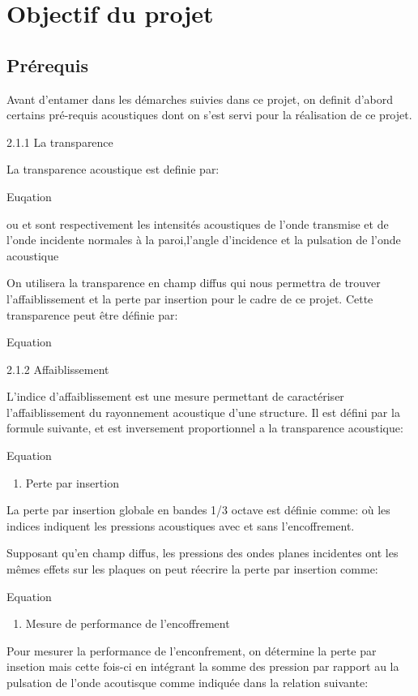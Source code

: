 \documentclass[12pt,foolscap]{report}
\begin{document}
\chapter{Objectif du projet}
\section{Prérequis }

Avant d'entamer dans les démarches suivies dans ce projet, on definit 
d'abord certains pré-requis acoustiques dont on s'est servi pour la 
réalisation de ce projet.



2.1.1 La transparence

La transparence acoustique est definie par: 

Euqation

ou et sont respectivement les intensités acoustiques de l'onde transmise et de l'onde incidente normales à la paroi,\theta l'angle d'incidence et \omega la pulsation de l'onde acoustique

On utilisera la transparence en champ diffus qui nous permettra de 
trouver l'affaiblissement et la perte par insertion pour le cadre de ce 
projet. Cette transparence peut être définie par:

Equation
 

2.1.2 Affaiblissement

L'indice d'affaiblissement est une mesure permettant de caractériser 
l'affaiblissement du rayonnement acoustique d'une structure. Il est 
défini par la formule suivante, et est inversement proportionnel a la 
transparence acoustique:

Equation

\begin{enumerate}
\item Perte par insertion
\end{enumerate}
La perte par insertion globale en bandes 1/3 octave est définie comme:
 où les indices
 indiquent les pressions acoustiques avec et sans l'encoffrement. 
 
Supposant qu'en champ diffus, les pressions des ondes planes incidentes 
ont les mêmes effets sur les plaques on peut réecrire la perte par 
insertion comme:

Equation

\begin{enumerate}
\item Mesure de performance de l'encoffrement 
\end{enumerate}
Pour mesurer la performance de l'enconfrement, on détermine la perte par 
insetion mais cette fois-ci en intégrant la somme des pression par 
rapport au la pulsation de l'onde acoutisque comme indiquée dans la 
relation suivante:
\end{document}
